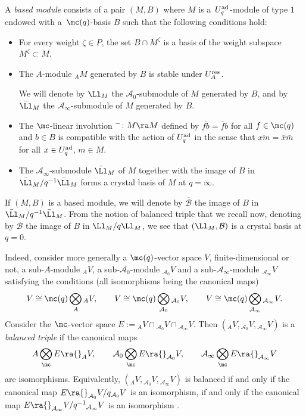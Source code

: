  A {\it based module} consists of a pair $(M,B)$ where $M$ is a~$U_q^{\rm ad}$-module of type $1$ endowed with a~$\mc(q)$-basis $B$ such that the following conditions hold:
\begin{itemize}\itemsep=0pt
\item[(i)] For every weight $\zeta\in P$, the set $B\cap M^{\zeta}$ is a basis of the weight subspace $M^{\zeta}\subset M$.
\item[(ii)] The $A$-module ${}_A M$ generated by $B$ is stable under $U_A^{\rm res}$.


We will denote by $\Ll_M$ the $\mathcal{A}_0$-submodule of $M$ generated by $B$, and by $\bar{\Ll}_M$ the $\mathcal{A}_\infty$-submodule of $M$ generated by $B$.


\item[(iii)] The $\mc$-linear involution ${}^-\colon M\ra M$ defined by $\overline{fb} = \overline{f}b$ for all $f\in \mc(q)$ and $b\in B$ is compatible with the action of $U_q^{\rm ad}$ in the sense that $\overline{xm} = \bar{x}\bar{m}$ for all $x\in U_q^{\rm ad}$, $m\in M$.
\item[(iv)] The $\mathcal{A}_\infty$-submodule $\bar{\Ll}_M$ of $M$ together with the image of $B$ in $\bar{\Ll}_M/q^{-1}\bar{\Ll}_M$ forms a crystal basis of $M$ at $q=\infty$.
\end{itemize}
If $(M,B)$ is a based module, we will denote by $\overline{\mathcal{B}}$ the image of $B$ in $\bar{\Ll}_M/q^{-1}\bar{\Ll}_M$. From the notion of balanced triple that we recall now, denoting by $\mathcal{B}$ the image of $B$ in $\Ll_M/q\Ll_M$, we see that $(\Ll_M,\mathcal{B})$ is a crystal basis at $q=0$.

Indeed, consider more generally a $\mc(q)$-vector space $V$, finite-dimensional or not, a sub-$A$-module ${}_AV$, a sub-$\mathcal{A}_0$-module ${}_{\mathcal{A}_0}V$ and a sub-$\mathcal{A}_\infty$-module ${}_{\mathcal{A}_\infty}V$ satisfying the conditions (all isomorphisms being the canonical maps)
\[V\cong \mc(q) \bigotimes_A {}_AV ,\qquad V\cong \mc(q) \bigotimes_{\mathcal{A}_0} {}_{\mathcal{A}_0}V ,\qquad V\cong \mc(q) \bigotimes_{\mathcal{A}_\infty} {}_{\mathcal{A}_\infty}V.\]
Consider the $\mc$-vector space $E := {}_AV \cap {}_{\mathcal{A}_0}V \cap {}_{\mathcal{A}_\infty}V$. Then $({}_AV, {}_{\mathcal{A}_0}V,{}_{\mathcal{A}_\infty}V)$ is a {\it balanced triple} \cite{Kashiwara1,Kashiwara2} if the canonical maps
\begin{equation}\label{condbalanced}
A \bigotimes_\mc E \ra {}_AV,\qquad \mathcal{A}_0 \bigotimes_\mc E \ra {}_{\mathcal{A}_0}V ,\qquad \mathcal{A}_\infty \bigotimes_\mc E \ra {}_{\mathcal{A}_\infty}V
\end{equation}
are isomorphisms. Equivalently, $({}_AV, {}_{\mathcal{A}_0}V,{}_{\mathcal{A}_\infty}V)$ is balanced if and only if the canonical map $E \ra {}_{\mathcal{A}_0}V/q{}_{\mathcal{A}_0}V$ is an isomorphism, if and only if the canonical map $E \ra {}_{\mathcal{A}_\infty}V/q^{-1}{}_{\mathcal{A}_\infty}V$ is an isomorphism \cite[Lemma 2.1.1]{Kashiwara2}.

